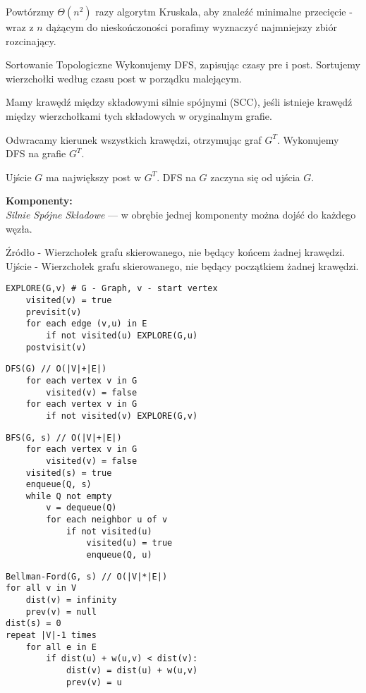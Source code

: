\documentclass[landscape,a4paper]{article}
\begin{document}
\begin{multicols}{5}
Powtórzmy $\Theta(n^2)$ razy algorytm Kruskala, aby znaleźć minimalne przecięcie - wraz z $n$ dążącym do nieskończoności porafimy wyznaczyć najmniejszy zbiór rozcinający.

Sortowanie Topologiczne
Wykonujemy DFS, zapisując czasy pre i post.
Sortujemy wierzchołki według czasu post w porządku malejącym.

Mamy krawędź między składowymi silnie spójnymi (SCC), jeśli istnieje krawędź między wierzchołkami tych składowych w oryginalnym grafie.

Odwracamy kierunek wszystkich krawędzi, otrzymując graf $G^T$.
Wykonujemy DFS na grafie $G^T$.

Ujście $G$ ma największy post w $G^T$.
DFS na $G$ zaczyna się od ujścia $G$.

\textbf{Komponenty:} \\
\textit{Silnie Spójne Składowe} — w obrębie jednej komponenty można dojść do każdego węzła.

Źródło - Wierzchołek grafu skierowanego, nie będący końcem żadnej krawędzi.\\
Ujście - Wierzchołek grafu skierowanego, nie będący początkiem żadnej krawędzi.

\begin{verbatim}
EXPLORE(G,v) # G - Graph, v - start vertex
    visited(v) = true
    previsit(v)
    for each edge (v,u) in E
        if not visited(u) EXPLORE(G,u)
    postvisit(v)
\end{verbatim}

\begin{verbatim}
DFS(G) // O(|V|+|E|)
    for each vertex v in G
        visited(v) = false
    for each vertex v in G
        if not visited(v) EXPLORE(G,v)
\end{verbatim}

\begin{verbatim}
BFS(G, s) // O(|V|+|E|)
    for each vertex v in G
        visited(v) = false
    visited(s) = true
    enqueue(Q, s)
    while Q not empty
        v = dequeue(Q)
        for each neighbor u of v
            if not visited(u)
                visited(u) = true
                enqueue(Q, u)
\end{verbatim}

\begin{verbatim}
Bellman-Ford(G, s) // O(|V|*|E|)
for all v in V
    dist(v) = infinity
    prev(v) = null
dist(s) = 0
repeat |V|-1 times
    for all e in E
        if dist(u) + w(u,v) < dist(v):
            dist(v) = dist(u) + w(u,v)
            prev(v) = u
\end{verbatim}


\end{multicols}
\end{document}
